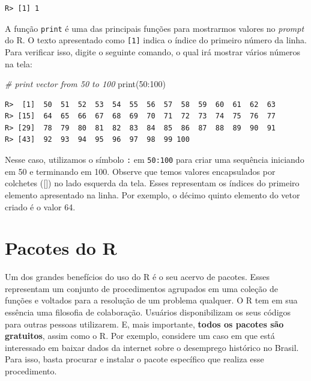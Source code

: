 \documentclass[
  11pt,
]{book}
\newenvironment{Shaded}{\begin{snugshade}}{\end{snugshade}}
\newcommand{\CommentTok}[1]{\textcolor[rgb]{0.37,0.37,0.37}{\textit{#1}}}
\newcommand{\DecValTok}[1]{\textcolor[rgb]{0.06,0.06,0.06}{#1}}
\newcommand{\FunctionTok}[1]{\textcolor[rgb]{0,0,0}{#1}}
\newcommand{\NormalTok}[1]{#1}
\newcommand{\SpecialCharTok}[1]{\textcolor[rgb]{0,0,0}{#1}}
\begin{document}
\begin{verbatim}
R> [1] 1
\end{verbatim}

A função \texttt{print} é uma das principais funções para mostrarmos valores no \emph{prompt} do R. O texto apresentado como \texttt{{[}1{]}} indica o índice do primeiro número da linha. Para verificar isso, digite o seguinte comando, o qual irá mostrar vários números na tela: 

\begin{Shaded}
\begin{Highlighting}[]
\CommentTok{\# print vector from 50 to 100}
\FunctionTok{print}\NormalTok{(}\DecValTok{50}\SpecialCharTok{:}\DecValTok{100}\NormalTok{)}
\end{Highlighting}
\end{Shaded}

\begin{verbatim}
R>  [1]  50  51  52  53  54  55  56  57  58  59  60  61  62  63
R> [15]  64  65  66  67  68  69  70  71  72  73  74  75  76  77
R> [29]  78  79  80  81  82  83  84  85  86  87  88  89  90  91
R> [43]  92  93  94  95  96  97  98  99 100
\end{verbatim}

Nesse caso, utilizamos o símbolo \texttt{:} em \texttt{50:100} para criar uma sequência iniciando em 50 e terminando em 100. Observe que temos valores encapsulados por colchetes ({[}{]}) no lado esquerda da tela. Esses representam os índices do primeiro elemento apresentado na linha. Por exemplo, o décimo quinto elemento do vetor criado é o valor 64.

\hypertarget{pacotes-do-r}{%
\section{Pacotes do R}\label{pacotes-do-r}}

Um dos grandes benefícios do uso do R é o seu acervo de pacotes. Esses representam um conjunto de procedimentos agrupados em uma coleção de funções e voltados para a resolução de um problema qualquer. O R tem em sua essência uma filosofia de colaboração. Usuários disponibilizam os seus códigos para outras pessoas utilizarem. E, mais importante, \textbf{todos os pacotes são gratuitos}, assim como o R. Por exemplo, considere um caso em que está interessado em baixar dados da internet sobre o desemprego histórico no Brasil. Para isso, basta procurar e instalar o pacote específico que realiza esse procedimento.
\end{document}
